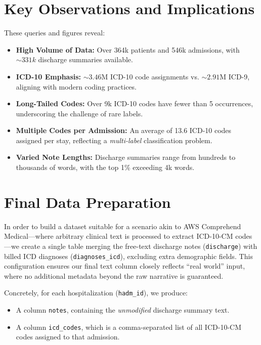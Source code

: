 \documentclass[12pt,a4paper]{report}
\begin{document}
\section{Key Observations and Implications}
These queries and figures reveal:
\begin{itemize}
    \item \textbf{High Volume of Data:} Over 364k patients and 546k admissions, with \(\sim331k\) discharge summaries available.
    \item \textbf{ICD-10 Emphasis:} \(\sim3.46\)M ICD-10 code assignments vs. \(\sim2.91\)M ICD-9, aligning with modern coding practices.
    \item \textbf{Long-Tailed Codes:} Over 9k ICD-10 codes have fewer than 5 occurrences, underscoring the challenge of rare labels.
    \item \textbf{Multiple Codes per Admission:} An average of 13.6 ICD-10 codes assigned per stay, reflecting a \textit{multi-label} classification problem.
    \item \textbf{Varied Note Lengths:} Discharge summaries range from hundreds to thousands of words, with the top 1\% exceeding 4k words.
\end{itemize}

\section{Final Data Preparation}
\label{sec:final-data-prep}

In order to build a dataset suitable for a scenario akin to AWS Comprehend Medical—where arbitrary clinical text is processed to extract ICD-10-CM codes—we create a single table merging the free-text discharge notes (\texttt{discharge}) with billed ICD diagnoses (\texttt{diagnoses\_icd}), excluding extra demographic fields. This configuration ensures our final text column closely reflects “real world” input, where no additional metadata beyond the raw narrative is guaranteed. 

Concretely, for each hospitalization (\texttt{hadm\_id}), we produce:
\begin{itemize}
    \item A column \texttt{notes}, containing the \textit{unmodified} discharge summary text. 
    \item A column \texttt{icd\_codes}, which is a comma-separated list of all ICD-10-CM codes assigned to that admission.
\end{itemize}
\end{document}
